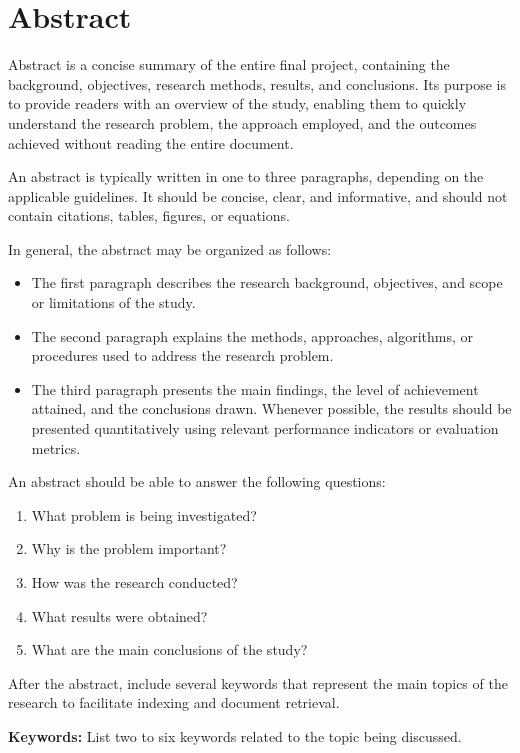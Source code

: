 \chapter*{Abstract}

\small Abstract is a concise summary of the entire final project, containing the background, objectives, research methods, results, and conclusions. Its purpose is to provide readers with an overview of the study, enabling them to quickly understand the research problem, the approach employed, and the outcomes achieved without reading the entire document.

An abstract is typically written in one to three paragraphs, depending on the applicable guidelines. It should be concise, clear, and informative, and should not contain citations, tables, figures, or equations.

In general, the abstract may be organized as follows:

\begin{itemize}[topsep=0pt,itemsep=0pt,parsep=0pt,leftmargin=*]
\item The first paragraph describes the research background, objectives, and scope or limitations of the study.
\item The second paragraph explains the methods, approaches, algorithms, or procedures used to address the research problem.
\item The third paragraph presents the main findings, the level of achievement attained, and the conclusions drawn. Whenever possible, the results should be presented quantitatively using relevant performance indicators or evaluation metrics.
\end{itemize}

An abstract should be able to answer the following questions:

\begin{enumerate}[topsep=0pt,itemsep=0pt,parsep=0pt,leftmargin=*]
\item What problem is being investigated?
\item Why is the problem important?
\item How was the research conducted?
\item What results were obtained?
\item What are the main conclusions of the study?
\end{enumerate}

After the abstract, include several keywords that represent the main topics of the research to facilitate indexing and document retrieval.\\
\vspace{1em}

\noindent \textbf{Keywords:} List two to six keywords related to the topic being discussed.

\normalsize
